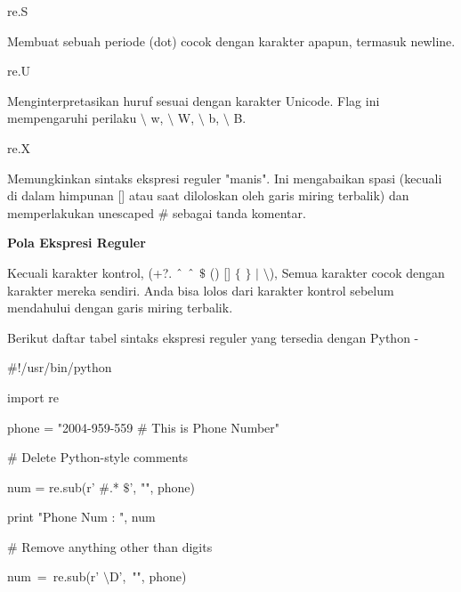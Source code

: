 \begin {enumerate}
\begin {enumerate}
\vspace{12pt}
\noindent
re.S \hspace*{0.5in}  \par
\noindent
Membuat sebuah periode (dot) cocok dengan karakter apapun, termasuk newline. \par
\noindent
re.U \hspace*{0.5in}  \par
\noindent
Menginterpretasikan huruf sesuai dengan karakter Unicode. Flag ini mempengaruhi perilaku  $  \setminus  $ w,  $  \setminus  $ W,  $  \setminus  $ b,  $  \setminus  $ B. \par
\vspace{12pt}
\noindent
re.X \hspace*{0.5in}  \par
\noindent
Memungkinkan sintaks ekspresi reguler "manis". Ini mengabaikan spasi (kecuali di dalam himpunan [] atau saat diloloskan oleh garis miring terbalik) dan memperlakukan unescaped  $  \#  $ sebagai tanda komentar. \par
\vspace{12pt}
\noindent
\textbf{Pola Ekspresi Reguler} \par
\vspace{12pt}
\noindent
Kecuali karakter kontrol, (+?.  $  \string^  $  $  \string^  $  $  \$  $ () []  $  \{  $ $  \}  $  $  \vert  $  $  \setminus  $), Semua karakter cocok dengan karakter mereka sendiri. Anda bisa lolos dari karakter kontrol sebelum mendahului dengan garis miring terbalik. \par
\noindent
Berikut daftar tabel sintaks ekspresi reguler yang tersedia dengan Python - \par
\noindent
 $  \#  $!/usr/bin/python \par
\noindent
import re \par
\vspace{12pt}
\noindent
phone = "2004-959-559  $  \#  $ This is Phone Number" \par
\vspace{12pt}
\noindent
 $  \#  $ Delete Python-style comments \par
\noindent
num = re.sub(r' $  \#  $.* $  \$  $', "", phone) \par
\noindent
print "Phone Num : ", num \par
\vspace{12pt}
\noindent
 $  \#  $ Remove anything other than digits \par
\noindent
num~=~re.sub(r' $  \setminus  $D',~"", phone)     \par

\end{enumerate}
\end{enumerate}
